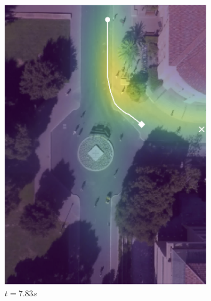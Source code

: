 \documentclass[conference]{IEEEtran}
\begin{document}
\begin{figure}
	\begin{subfigure}[b]{.45\linewidth}
		\includegraphics[width=\linewidth]{./figures/FirstPage/gates_1_2_t=235.png}
		\caption{$t=7.83s$}
	\end{subfigure}
	\begin{subfigure}[b]{.45\linewidth}

\end{subfigure}
\end{figure}
\end{document}
